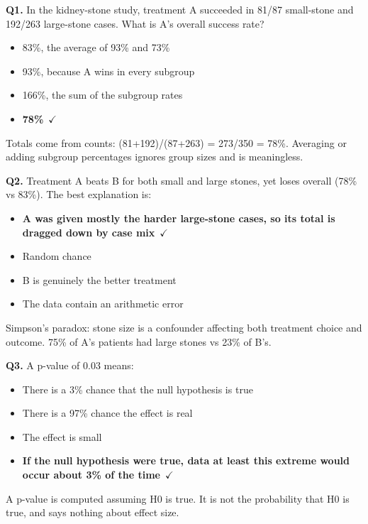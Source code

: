 \documentclass[11pt]{article}
\begin{document}
{\small

\noindent\textbf{Q1.} In the kidney-stone study, treatment A succeeded in 81/87 small-stone and 192/263 large-stone cases. What is A's overall success rate?\begin{itemize}[leftmargin=2.2em,itemsep=0pt,topsep=1pt]\item[A.] 83\%, the average of 93\% and 73\%\item[B.] 93\%, because A wins in every subgroup\item[C.] 166\%, the sum of the subgroup rates\item[\textbf{D.}] \textbf{78\%}~{\color{GrnN}$\checkmark$}\end{itemize} Totals come from counts: (81+192)/(87+263) = 273/350 = 78\%. Averaging or adding subgroup percentages ignores group sizes and is meaningless.\par\medskip

\noindent\textbf{Q2.} Treatment A beats B for both small and large stones, yet loses overall (78\% vs 83\%). The best explanation is:\begin{itemize}[leftmargin=2.2em,itemsep=0pt,topsep=1pt]\item[\textbf{A.}] \textbf{A was given mostly the harder large-stone cases, so its total is dragged down by case mix}~{\color{GrnN}$\checkmark$}\item[B.] Random chance\item[C.] B is genuinely the better treatment\item[D.] The data contain an arithmetic error\end{itemize} Simpson's paradox: stone size is a confounder affecting both treatment choice and outcome. 75\% of A's patients had large stones vs 23\% of B's.\par\medskip

\noindent\textbf{Q3.} A p-value of 0.03 means:\begin{itemize}[leftmargin=2.2em,itemsep=0pt,topsep=1pt]\item[A.] There is a 3\% chance that the null hypothesis is true\item[B.] There is a 97\% chance the effect is real\item[C.] The effect is small\item[\textbf{D.}] \textbf{If the null hypothesis were true, data at least this extreme would occur about 3\% of the time}~{\color{GrnN}$\checkmark$}\end{itemize} A p-value is computed assuming H0 is true. It is not the probability that H0 is true, and says nothing about effect size.\par\medskip

}
\end{document}
